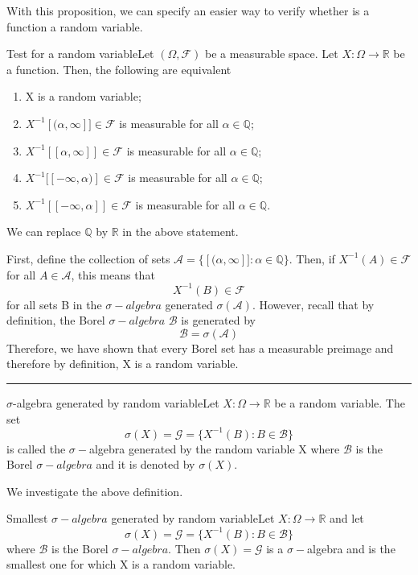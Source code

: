 \documentclass[twoside]{article}
\newenvironment{proof}{{\bf Proof:}}{\hfill\rule{2mm}{2mm}}
\newcommand{\algebra}{\mathcal{A}}
\newcommand{\sigmalgebra}{\mathcal{F}}
\newcommand{\borelsigmaalgebra}{\mathcal{B}}
\newcommand{\sa}{\sigma-algebra}
\begin{document}
With this proposition, we can specify an easier way to verify whether is a function a random variable.

\begin{theorem_exam}{Test for a random variable}{}Let $(\Omega, \sigmalgebra)$ be a measurable space. Let $X: \Omega \rightarrow \mathbb{R}$ be a function. Then, the following are equivalent 
\begin{enumerate}
\item X is a random variable;
\item $X^{-1}[(\alpha, \infty]] \in \sigmalgebra$ is measurable for all $\alpha \in \mathbb{Q}$;
\item $X^{-1}[[\alpha, \infty]] \in \sigmalgebra$ is measurable for all $\alpha \in \mathbb{Q}$;
\item $X^{-1}[[-\infty, \alpha)] \in \sigmalgebra$ is measurable for all $\alpha \in \mathbb{Q}$;
\item $X^{-1}[[-\infty, \alpha]] \in \sigmalgebra$ is measurable for all $\alpha \in \mathbb{Q}$.
\end{enumerate}
We can replace $\mathbb{Q}$ by $\mathbb{R}$ in the above statement.
\end{theorem_exam}

\begin{proof} First, define the collection of sets $\algebra = \{[(\alpha, \infty]]: \alpha \in \mathbb{Q}\}.$ Then, if $X^{-1}(A) \in \sigmalgebra$ for all $A \in \algebra$, this means that 
$$
X^{-1}(B) \in \sigmalgebra
$$
for all sets B in the $\sa$ generated $\sigma(\algebra).$ However, recall that by definition, the Borel $\sa$ $\borelsigmaalgebra$ is generated by
$$
\borelsigmaalgebra = \sigma(\algebra)
$$
Therefore, we have shown that every Borel set has a measurable preimage and therefore by definition, X is a random variable.
\end{proof}

\begin{definition_exam}{$\sigma$-algebra generated by random variable}{}Let $X: \Omega \rightarrow \mathbb{R}$ be a random variable. The set $$\sigma(X) = \mathcal{G} = \{X^{-1}(B): B \in \borelsigmaalgebra\}$$ is called the $\sigma-$algebra generated by the random variable X where $\borelsigmaalgebra$ is the Borel $\sa$ and it is denoted by $\sigma(X).$
\end{definition_exam}
We investigate the above definition.

\begin{proposition_exam}{Smallest $\sa$ generated by random variable}{}Let $X: \Omega \rightarrow \mathbb{R}$ and let $$\sigma(X) = \mathcal{G} = \{X^{-1}(B): B \in \borelsigmaalgebra\}$$ where $\borelsigmaalgebra$ is the Borel $\sa.$ Then $\sigma(X) = \mathcal{G}$ is a $\sigma-$algebra and is the smallest one for which X is a random variable.
\end{proposition_exam}
\end{document}
